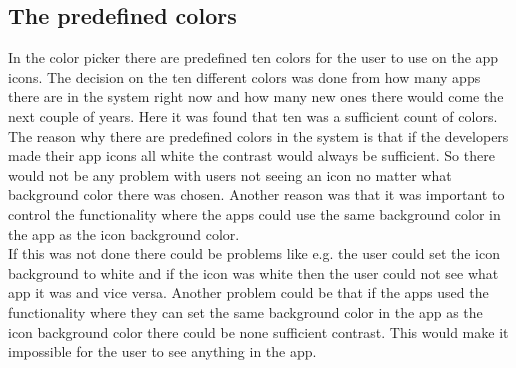 \subsection{The predefined colors} 
\label{GUI:colors}
In the color picker there are predefined ten colors for the user to use on the app icons. The decision on the ten different colors was done from how many apps there are in the \giraf[] system right now and how many new ones there would come the next couple of years. Here it was found that ten was a sufficient count of colors. \\
The reason why there are predefined colors in the \giraf[] system is that if the developers made their app icons all white the contrast would always be sufficient. So there would not be any problem with users not seeing an icon no matter what background color there was chosen.  Another reason was that it was important to control the functionality where the apps could use the same background color in the app as the icon background color. \\
If this was not done there could be problems like e.g. the user could set the icon background to white and if the icon was white then the user could not see what app it was and vice versa. Another problem could be that if the apps used the functionality where they can set the same background color in the app as the icon background color there could be none sufficient contrast. This would make it impossible for the user to see anything in the app.

